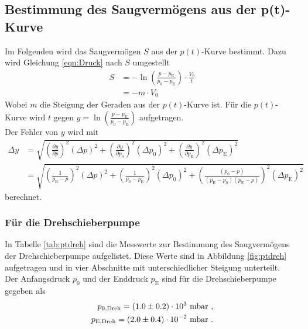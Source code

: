 \subsection{Bestimmung des Saugvermögens aus der p(t)-Kurve}
Im Folgenden wird das Saugvermögen $S$ aus der $p(t)$-Kurve bestimmt. Dazu wird Gleichung \eqref{eqn:Druck} nach $S$ umgestellt
\begin{align}
  S &= -\ln\left(\frac{p - p_\text{E}}{p_0 - p_\text{E}} \right) \cdot \frac{V_0}{t} \\
  &= -m\cdot V_0
\end{align}
Wobei $m$ die Steigung der Geraden aus der $p(t)$-Kurve ist. Für die $p(t)$-Kurve wird $t$ gegen $y = \ln\left(\frac{p - p_\text{E}}{p_0 - p_\text{E}} \right)$ aufgetragen. \\
Der Fehler von $y$ wird mit
\begin{align}
  \Delta y &= \sqrt{ \left(\frac{\partial y}{\partial p} \right)^2 (\Delta p)^2 + \left(\frac{\partial y}{\partial p_0} \right)^2 (\Delta p_0)^2 + \left(\frac{\partial y}{\partial p_\text{E}} \right)^2 (\Delta p_\text{E})^2 } \nonumber \\
  &= \sqrt{ \left(\frac{1}{p_\text{E}-p} \right)^2 (\Delta p)^2 + \left(\frac{1}{p_0-p_\text{E}} \right)^2 (\Delta p_0)^2 + \left(\frac{(p_0-p)}{(p_\text{E}-p_0)(p_\text{E}-p)} \right)^2 (\Delta p_\text{E})^2 }
\end{align}
berechnet.



\subsubsection{Für die Drehschieberpumpe}
In Tabelle \eqref{tab:ptdreh} sind die Messwerte zur Bestimmung des Saugvermögens der Drehschieberpumpe aufgelistet. Diese Werte sind in Abbildung \eqref{fig:ptdreh} aufgetragen und in vier Abschnitte mit unterschiedlicher Steigung unterteilt. \\
Der Anfangsdruck $p_0$ und der Enddruck $p_\text{E}$ sind für die Drehschieberpumpe gegeben als
\begin{align*}
  p_{0,\text{Dreh}} = (\num{1 +- 0.2})\cdot 10^3\ \text{mbar} \ , \\
  p_{\text{E},\text{Dreh}} = (\num{2 +- 0.4})\cdot 10^{-2}\ \text{mbar} \ .
\end{align*}

